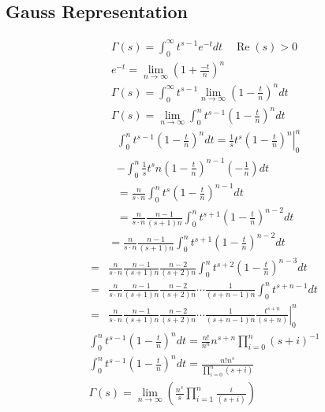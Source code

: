 	\subsection{Gauss Representation}
	$$
	\begin{gathered}
		\Gamma(s)=\int_0^{\infty} t^{s-1} e^{-t} d t \quad \operatorname{Re}(s)>0 \\
		e^{-t}=\lim _{n \rightarrow \infty}\left(1+\frac{-t}{n}\right)^n \\
		\Gamma(s)=\int_0^{\infty} t^{s-1} \lim _{n \rightarrow \infty}\left(1-\frac{t}{n}\right)^n d t \\
		\Gamma(s)=\lim _{n \rightarrow \infty} \int_0^{n} t^{s-1}\left(1-\frac{t}{n}\right)^n d t
	\end{gathered}
	$$
	$$
	\begin{aligned}
		&\int_0^n t^{s-1}\left(1-\frac{t}{n}\right)^n d t=\left.\frac{1}{s} t^s\left(1-\frac{t}{n}\right)^n\right|_0 ^n \\
		&-\int_0^n \frac{1}{s} t^s n\left(1-\frac{t}{n}\right)^{n-1}\left(-\frac{1}{n}\right) d t \\
		&=\frac{n}{s \cdot n} \int_0^n t^s\left(1-\frac{t}{n}\right)^{n-1} d t \\
		&=\frac{n}{s \cdot n} \frac{n-1}{(s+1) n} \int_0^n t^{s+1}\left(1-\frac{t}{n}\right)^{n-2} d t
	\end{aligned}
	$$
	$$
	\begin{aligned}
		&=\frac{n}{s \cdot n} \frac{n-1}{(s+1) n} \int_0^n t^{s+1}\left(1-\frac{t}{n}\right)^{n-2} d t \\
		=& \frac{n}{s \cdot n} \frac{n-1}{(s+1) n} \frac{n-2}{(s+2) n} \int_0^n t^{s+2}\left(1-\frac{t}{n}\right)^{n-3} d t \\
		=& \frac{n}{s \cdot n} \frac{n-1}{(s+1) n} \frac{n-2}{(s+2) n} \cdots \frac{1}{(s+n-1) n} \int_0^n t^{s+n-1} d t \\
		=&\left.\frac{n}{s \cdot n} \frac{n-1}{(s+1) n} \frac{n-2}{(s+2) n} \cdots \frac{1}{(s+n-1) n} \frac{t^{s+n}}{(s+n)}\right|_0 ^n
	\end{aligned}
	$$
	$$
	\begin{gathered}
		\int_0^n t^{s-1}\left(1-\frac{t}{n}\right)^n d t=\frac{n !}{n^n} n^{s+n} \prod_{i=0}^n(s+i)^{-1} \\
		\int_0^n t^{s-1}\left(1-\frac{t}{n}\right)^n d t=\frac{n ! n^s}{\prod_{i=0}^n(s+i)} \\
		\Gamma(s)=\lim _{n \rightarrow \infty}\left(\frac{n^s}{s} \prod_{i=1}^n \frac{i}{(s+i)}\right)
	\end{gathered}
	$$
